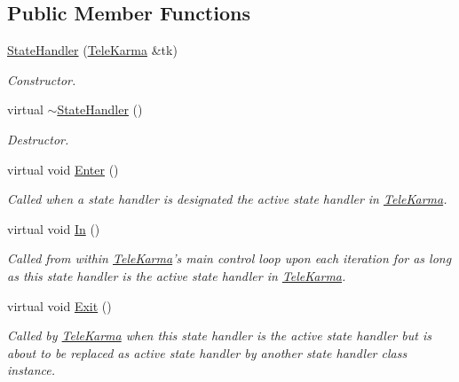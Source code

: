 \subsection*{Public Member Functions}
\begin{CompactItemize}
\item 
\hyperlink{classStateHandler_4195b90b30a542cc31b1cfe4ac9df201}{StateHandler} (\hyperlink{classTeleKarma}{TeleKarma} \&tk)
\begin{CompactList}\small\item\em Constructor. \item\end{CompactList}\item 
virtual \hyperlink{classStateHandler_e80b39428525c88bdeea3efd94d540f9}{$\sim$StateHandler} ()
\begin{CompactList}\small\item\em Destructor. \item\end{CompactList}\item 
virtual void \hyperlink{classStateHandler_c08036e743cf5172d6931cf3b6d321c6}{Enter} ()
\begin{CompactList}\small\item\em Called when a state handler is designated the active state handler in \hyperlink{classTeleKarma}{TeleKarma}. \item\end{CompactList}\item 
\hypertarget{classStateHandler_cee16f855e7354d21abafa47acd1046c}{
virtual void \hyperlink{classStateHandler_cee16f855e7354d21abafa47acd1046c}{In} ()}
\label{classStateHandler_cee16f855e7354d21abafa47acd1046c}

\begin{CompactList}\small\item\em Called from within \hyperlink{classTeleKarma}{TeleKarma}'s main control loop upon each iteration for as long as this state handler is the active state handler in \hyperlink{classTeleKarma}{TeleKarma}. \item\end{CompactList}\item 
\hypertarget{classStateHandler_5ce0f2cb3d4a9f5aca137d47eac75c1e}{
virtual void \hyperlink{classStateHandler_5ce0f2cb3d4a9f5aca137d47eac75c1e}{Exit} ()}
\label{classStateHandler_5ce0f2cb3d4a9f5aca137d47eac75c1e}

\begin{CompactList}\small\item\em Called by \hyperlink{classTeleKarma}{TeleKarma} when this state handler is the active state handler but is about to be replaced as active state handler by another state handler class instance. \item\end{CompactList}\end{CompactItemize}
